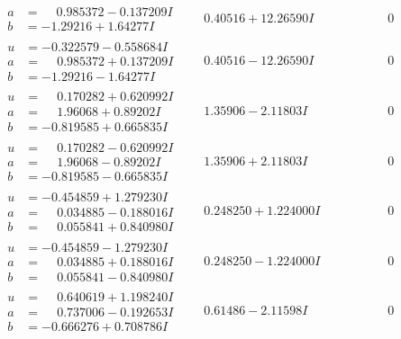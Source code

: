 \documentclass[1p]{elsarticle_modified}
\theoremstyle{definition}
\begin{document}
$$\begin{array}{c|c|c}
\begin{aligned}
a &= \phantom{-}0.985372 - 0.137209 I \\
b &= -1.29216 + 1.64277 I\end{aligned}
 & \phantom{-}0.40516 + 12.26590 I & \phantom{-0.000000 } 0 \\ \hline\begin{aligned}
u &= -0.322579 - 0.558684 I \\
a &= \phantom{-}0.985372 + 0.137209 I \\
b &= -1.29216 - 1.64277 I\end{aligned}
 & \phantom{-}0.40516 - 12.26590 I & \phantom{-0.000000 } 0 \\ \hline\begin{aligned}
u &= \phantom{-}0.170282 + 0.620992 I \\
a &= \phantom{-}1.96068 + 0.89202 I \\
b &= -0.819585 + 0.665835 I\end{aligned}
 & \phantom{-}1.35906 - 2.11803 I & \phantom{-0.000000 } 0 \\ \hline\begin{aligned}
u &= \phantom{-}0.170282 - 0.620992 I \\
a &= \phantom{-}1.96068 - 0.89202 I \\
b &= -0.819585 - 0.665835 I\end{aligned}
 & \phantom{-}1.35906 + 2.11803 I & \phantom{-0.000000 } 0 \\ \hline\begin{aligned}
u &= -0.454859 + 1.279230 I \\
a &= \phantom{-}0.034885 - 0.188016 I \\
b &= \phantom{-}0.055841 + 0.840980 I\end{aligned}
 & \phantom{-}0.248250 + 1.224000 I & \phantom{-0.000000 } 0 \\ \hline\begin{aligned}
u &= -0.454859 - 1.279230 I \\
a &= \phantom{-}0.034885 + 0.188016 I \\
b &= \phantom{-}0.055841 - 0.840980 I\end{aligned}
 & \phantom{-}0.248250 - 1.224000 I & \phantom{-0.000000 } 0 \\ \hline\begin{aligned}
u &= \phantom{-}0.640619 + 1.198240 I \\
a &= \phantom{-}0.737006 - 0.192653 I \\
b &= -0.666276 + 0.708786 I\end{aligned}
 & \phantom{-}0.61486 - 2.11598 I & \phantom{-0.000000 } 0 \\ \hline\begin{aligned}

\end{aligned}
\end{array}$$
\end{document}
